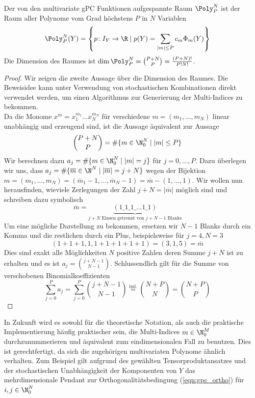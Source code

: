 \begin{mathbem}
Der von den multivariate gPC Funktionen aufgespannte Raum $\Poly_P^N$ ist der Raum aller Polynome vom Grad höchstens $P$ in $N$ Variablen
\[\Poly_P^N(Y)=\left\lbrace p\colon I_Y\to \R \mid p(Y)=\sum_{|m|\le P}c_m\Phi_m(Y)\right\rbrace\]
Die Dimension des Raumes ist $\dim\Poly_P^N=\binom{P+N}{P}=\frac{(P+N)!}{P!N!}$.
\end{mathbem}
\begin{proof}
Wir zeigen die zweite Aussage über die Dimension des Raumes. Die Beweisidee kann unter Verwendung von stochastischen Kombinationen direkt verwendet werden, um einen Algorithmus zur Generierung der Multi-Indices zu bekommen.\\
Da die Monome $x^m=x_1^{m_1}\dots x_N^{m_N}$ für verschiedene $m=(m_1,\dots,m_N)$ linear unabhängig und erzeugend sind, ist die Aussage äquivalent zur Aussage
\[\binom{P+N}{P}=\#\lbrace m\in\N_0^N \mid |m|\le P\rbrace\] 
Wir berechnen dazu $a_j=\#\lbrace m\in\N_0^N \mid |m|=j\rbrace$ für $j=0,\dots,P$. Dazu überlegen wir uns, dass $a_j=\#\lbrace \overline{m}\in\N^N \mid |\overline{m}|=j+N\rbrace$ wegen der Bijektion $m=(m_1,\dots,m_N)=(\overline{m}_1-1,\dots,\overline{m}_N-1)=\overline{m}-(1,\dots,1)$. Wir wollen nun herausfinden, wieviele Zerlegungen der Zahl $j+N=|\overline{m}|$ möglich sind und schreiben dazu symbolisch
\[\overline{m}=\underbrace{(1\_1\_1\_\dots 1\_1)}_{j+N\text{ Einsen getrennt von } j+N-1 \text{ Blanks}}\]
Um eine mögliche Darstellung zu bekommen, ersetzen wir $N-1$ Blanks durch ein Komma und die restlichen durch ein Plus, beispielsweise für $j=4,N=3$
\[(1+1+1,1,1+1+1+1+1)=(3,1,5)=\overline{m}\]
Dies sind exakt alle Möglichkeiten $N$ positive Zahlen deren Summe $j+N$ ist zu erhalten und es ist $a_j=\binom{j+N-1}{N-1}$.
Schlussendlich gilt für die Summe von verschobenen Binomialkoeffizienten 
\[\sum_{j=0}^Pa_j=\sum_{j=0}^P\binom{j+N-1}{N-1}\stackrel{\text{ind.}}{=}\binom{N+P}{N}=\binom{N+P}{P}\]
\end{proof}
In Zukunft wird es sowohl für die theoretische Notation, als auch die praktische Implementierung häufig praktischer sein, die Multi-Indices $m\in\N_0^M$ durchzunummerieren und äquivalent zum eindimensionalen Fall zu benutzen. Dies ist gerechtfertigt, da sich die zugehörigen multivariaten Polynome ähnlich verhalten. Zum Beispiel gilt aufgrund des gewählten Tensorproduktansatzes und der stochastischen Unabhängigkeit der Komponenten von $Y$ das mehrdimensionale Pendant zur Orthogonalitätsbedingung (\ref{eqn:gpc_ortho}) für $i,j\in\N_0^N$
